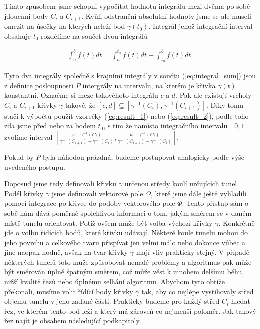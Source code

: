 Tímto způsobem jsme schopni vypočítat hodnotu integrálu mezi dvěma po sobě jdoucími
body $ C_i $ a $ C_{i + 1} $. Kvůli odstranění absolutní hodnoty jsme se ale
museli omezit na úsečky na kterých neleží bod $ \gamma(t_0) $. Integrál jehož
integrační interval obsahuje $ t_0 $ rozdělíme na součet dvou
integrálů

\begin{align*}
    \int_{a}^{b} f(t) dt = \int_{a}^{t_0} f(t) dt + \int_{t_0}^{b} f(t) dt.
\end{align*}

Tyto dva integrály společně s krajními integrály v součtu (\ref{eq:integral_sum})
jsou z definice posloupnosti $ P $ intergrály na intervalu, na kterém je křivka
$ \gamma(t) $ konstantní. Označme si meze takovéhoto integrálu $ c $ a $ d $.
Pak ale existují vrcholy $ C_i $ a $ C_{i + 1} $ křivky $ \gamma $ takové, že
$ [c, d] \subseteq [\gamma^{-1}(C_i), \gamma^{-1}(C_{i + 1})] $. Díky tomu stačí
k výpočtu použít vzorečky (\ref{eq:result_1}) nebo (\ref{eq:result_2}), podle
toho zda jsme před nebo za bodem $ t_0 $, s tím že
namísto integračního intervalu $ [0, 1] $ zvolíme interval
$ \left[ \frac{c - \gamma^{-1}(C_i)}{\gamma^{-1}(C_{i + 1}) - \gamma^{-1}(C_i)},
 \frac{d - \gamma^{-1}(C_i)}{\gamma^{-1}(C_{i + 1}) - \gamma^{-1}(C_i)} \right] $.

Pokud by $ P $ byla náhodou prázdná, budeme postupovat
analogicky podle výše uvedeného postupu.

Doposud jsme tedy definovali křivku $ \gamma $ určenou středy koulí určujících
tunel. Podél křivky $ \gamma $ jsme definovali vektorové pole $ \Omega $, které
jsme dále ještě vyhladili pomocí integrace po křivce do podoby vektorového
pole $ \Phi $. Tento přístup sám o sobě nám dává poměrně spolehlivou informaci
o tom, jakým směrem se v daném místě tunelu orientovat. Potíž ovšem
může být volba výchozí křivky $ \gamma $. Konkrétně jde o volbu řídících bodů,
které křivku udávají. Některé koule tunelu mohou do jeho povrchu a celkového
tvaru přispívat jen velmi málo nebo dokonce vůbec a jiné naopak hodně, avšak na tvar
křivky $ \gamma $ mají vliv prakticky stejný. V případě některých tunelů
toto může způsobovat nemalé problémy a algoritmus pak může být směrován úplně
špatným směrem, což může vést k mnohem delšímu běhu, nižší kvalitě řezů nebo
úplnému selhání algoritmu. Abychom tyto obtíže překonali, musíme volit
řídící body křivky $ \gamma $ tak, aby co nejlépe vystihovaly střed objemu
tunelu v jeho zadané části. Prakticky budeme pro každý střed $ C_i $ hledat řez,
ve kterém tento bod leží a který má zároveň co nejmenší poloměr. Jak takový
řez najít je obsahem následující podkapitoly.






